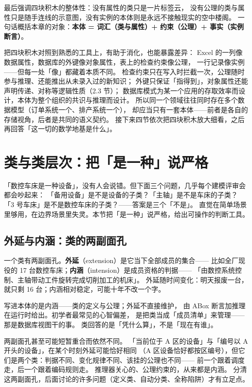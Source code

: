 最后强调四块积木的整体性：没有属性的类只是一片标签云，
没有公理的类与属性只是随手连线的示意图，没有实例的本体则是永远不接触现实的空中楼阁。
一句话概括本章的对象：\textbf{本体 = 词汇（类与属性）+ 约束（公理）+ 事实（实例断言）}。

把四块积木对照到熟悉的工具上，有助于消化，也能暴露差异：
Excel 的一列像数据属性，数据库的外键像对象属性，表上的检查约束像公理，
一行记录像实例——但每一处「像」都藏着本质不同。
检查约束只在写入时拦截一次，公理随时参与推理、还能推出从未录入过的新知识；
外键只保证「指得到」，对象属性还能声明传递、对称等逻辑性质（2.3 节）；
数据库模式为某一个应用的存取效率而设计，本体为整个组织的共识与推理而设计。
所以同一个领域往往同时存在多个数据模型（订单系统一个、排产系统一个），
却应当只有一套本体——前者是各自的存储视角，后者是共同的语义契约。
接下来四节依次把四块积木放大细看，之后再回答「这一切的数学地基是什么」。

\section{类与类层次：把「是一种」说严格}

「数控车床是一种设备」，没有人会说错。但下面三个问题，几乎每个建模评审会都会吵起来：
「备用设备」是不是设备的子类？「主轴」是不是车床的子类？
「3 号车床」是不是数控车床的子类？——答案是三个「不是」。
直觉在简单场景里够用，在边界场景里失灵。本节把「是一种」说严格，给出可操作的判断工具。

\subsection{外延与内涵：类的两副面孔}

一个类有两副面孔。\textbf{外延}（extension）是它当下全部成员的集合——
比如全厂现役的 17 台数控车床；\textbf{内涵}（intension）是成员资格的判据——
「由数控系统控制、主轴带动工件旋转完成切削加工的机床」。
外延随时间变化：明天报废一台，就只剩 16 台；内涵相对稳定，可能十年不改一个字。

写进本体的是内涵——类的定义与公理；外延不直接维护，
由 ABox 断言加推理在运行时给出。初学者最常见的心智偏差，
是把类当成「成员清单」来管理——那是数据库视图干的事。
类回答的是「凭什么算」，不是「现在有谁」。

两副面孔甚至可能短暂重合而依然不同。
「当前位于 A 区的设备」与「编号以 A 开头的设备」，在某个时刻外延可能恰好相同
（A 区设备恰好都按区编号），但它们是两个类：判据不同、变化规律不同、该挂的公理也不同——
前一个跟着调度走，后一个跟着编码规则走。
推理器关心的、公理约束的，从来都是内涵。
分清这两副面孔，后面讨论的许多问题（定义类、自动分类、全称陷阱）才有立足点。

